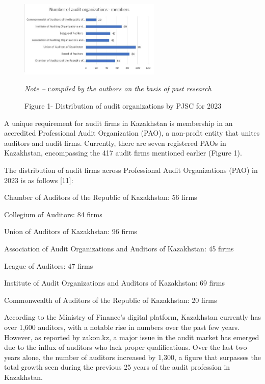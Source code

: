 \begin{figure}[H]
	\centering
	\includegraphics[width=0.6\textwidth]{media/ekon/image7.2}
	\caption*{Figure 1- Distribution of audit organizations by PJSC for 2023}
	\emph{Note -- сompiled by the authors on the basis of past research}

\end{figure}

\begin{multicols}{2}

  A unique requirement for audit firms in Kazakhstan is membership in an
  accredited Professional Audit Organization (PAO), a non-profit entity
  that unites auditors and audit firms. Currently, there are seven
  registered PAOs in Kazakhstan, encompassing the 417 audit firms
  mentioned earlier (Figure 1).


The distribution of audit firms across Professional Audit Organizations
(PAO) in 2023 is as follows {[}11{]}:

Chamber of Auditors of the Republic of Kazakhstan: 56 firms

Collegium of Auditors: 84 firms

Union of Auditors of Kazakhstan: 96 firms

Association of Audit Organizations and Auditors of Kazakhstan: 45 firms

League of Auditors: 47 firms

Institute of Audit Organizations and Auditors of Kazakhstan: 69 firms

Commonwealth of Auditors of the Republic of Kazakhstan: 20 firms

According to the Ministry of Finance's digital platform, Kazakhstan
currently has over 1,600 auditors, with a notable rise in numbers over
the past few years. However, as reported by zakon.kz, a major issue in
the audit market has emerged due to the influx of auditors who lack
proper qualifications. Over the last two years alone, the number of
auditors increased by 1,300, a figure that surpasses the total growth
seen during the previous 25 years of the audit profession in Kazakhstan.


\end{multicols}
